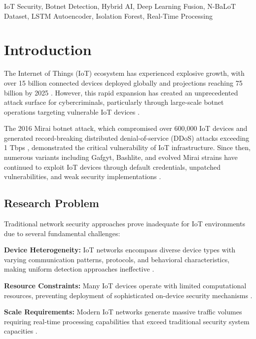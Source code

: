 \documentclass[conference]{IEEEtran}
\begin{document}
\begin{IEEEkeywords}
IoT Security, Botnet Detection, Hybrid AI, Deep Learning Fusion, N-BaLoT Dataset, LSTM Autoencoder, Isolation Forest, Real-Time Processing
\end{IEEEkeywords}

\section{Introduction}

The Internet of Things (IoT) ecosystem has experienced explosive growth, with over 15 billion connected devices deployed globally and projections reaching 75 billion by 2025 \cite{statista2024}. However, this rapid expansion has created an unprecedented attack surface for cybercriminals, particularly through large-scale botnet operations targeting vulnerable IoT devices \cite{mirai2016analysis}.

The 2016 Mirai botnet attack, which compromised over 600,000 IoT devices and generated record-breaking distributed denial-of-service (DDoS) attacks exceeding 1 Tbps \cite{krebs2016mirai}, demonstrated the critical vulnerability of IoT infrastructure. Since then, numerous variants including Gafgyt, Bashlite, and evolved Mirai strains have continued to exploit IoT devices through default credentials, unpatched vulnerabilities, and weak security implementations \cite{kolias2017ddos}.

\subsection{Research Problem}

Traditional network security approaches prove inadequate for IoT environments due to several fundamental challenges:

\textbf{Device Heterogeneity:} IoT networks encompass diverse device types with varying communication patterns, protocols, and behavioral characteristics, making uniform detection approaches ineffective \cite{raza2013svelte}.

\textbf{Resource Constraints:} Many IoT devices operate with limited computational resources, preventing deployment of sophisticated on-device security mechanisms \cite{yang2017survey}.

\textbf{Scale Requirements:} Modern IoT networks generate massive traffic volumes requiring real-time processing capabilities that exceed traditional security system capacities \cite{zhang2020survey}.
\end{document}
